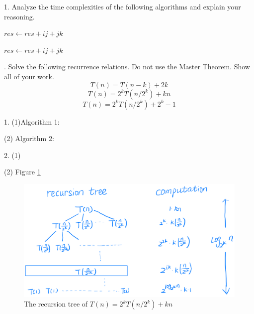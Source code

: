 \problem{}

1. Analyze the time complexities of the following algorithms and explain your reasoning.

\begin{algorithm}
\caption{}
\begin{algorithmic}
            \State $res \gets res + ij + jk$
        \EndFor
    \EndFor
\EndFor
\end{algorithmic}
\end{algorithm}


\begin{algorithm}
\caption{}
\begin{algorithmic}
            \State $res \gets res + ij + jk$
        \EndFor
    \EndFor
\EndFor
\end{algorithmic}
\end{algorithm}

. Solve the following recurrence relations. Do not use the Master Theorem. Show all of your work.
$$T(n) = T(n-k) + 2k$$
$$T(n) = 2^kT(n/2^k) + kn$$
$$T(n) = 2^kT(n/2^k) + 2^k-1$$


\solution{}
1. (1)Algorithm 1:


(2) Algorithm 2:



2. (1)



(2) Figure  \ref{fig:t1_22}


\begin{figure}[htbp]
    \centering
    \includegraphics[width=0.9\linewidth]{./figure/t1_22.png}
    \caption{The recursion tree of $T(n) = 2^kT(n/2^k) + kn$}
    \label{fig:t1_22}
\end{figure}


